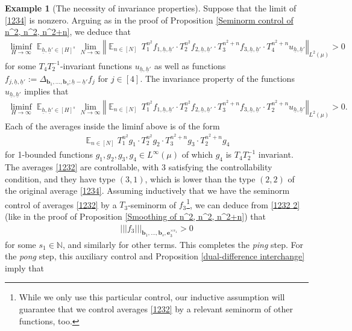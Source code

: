 \documentclass[11pt]{amsart}
\theoremstyle{definition}
\newtheorem{example}{Example}
\newcommand{\N}{{\mathbb N}}
\newcommand{\be}{{\mathbf{e}}}
\renewcommand{\b}{{\textbf{b}}}
\newcommand{\uh}{{\underline{h}}}
\newcommand{\norm}[1]{\left\Vert #1\right\Vert}
\newcommand{\nnorm}[1]{\lvert\!|\!| #1|\!|\!\rvert}
\newcommand{\inv}{^{-1}}
\DeclareMathOperator*{\E}{\mathbb{E}}
\begin{document}
\begin{example}[The necessity of invariance properties]
Suppose that the limit of \eqref{1234} is nonzero. Arguing as in the proof of Proposition \ref{Seminorm control of n^2, n^2, n^2+n}, we deduce  that
\begin{align*}
    \liminf_{H\to\infty}\E_{\uh,\uh'\in [H]^{s}}\lim_{N\to\infty}\norm{ \E_{n\in[N]} \, T_1^{n^2} f_{1, \uh, \uh'}\cdot T_2^{n^2} f_{2, \uh, \uh'}\cdot T_3^{n^2+n}f_{3, \uh, \uh'}\cdot T_4^{n^2+n}u_{\uh,\uh'}}_{L^2(\mu)}>0
\end{align*}
for some $T_4 T_2\inv$-invariant functions $u_{\uh, \uh'}$ as well as functions $f_{j, \uh,\uh'} := \Delta_{{\b_1}, \ldots, {\b_{s}}; \uh-\uh'} f_j$ for $j\in[4]$. The invariance property of the functions $u_{\uh, \uh'}$ implies that
\begin{align}\label{1232 2}
    \liminf_{H\to\infty}\E_{\uh,\uh'\in [H]^{s}}\lim_{N\to\infty}\norm{ \E_{n\in[N]} \, T_1^{n^2} f_{1, \uh, \uh'}\cdot T_2^{n^2} f_{2, \uh, \uh'}\cdot T_3^{n^2+n}f_{3, \uh, \uh'}\cdot T_2^{n^2+n}u_{\uh,\uh'}}_{L^2(\mu)}>0.
\end{align}
Each of the averages inside the liminf above is of the form
\begin{align}\label{1232}
     \E_{n\in[N]}T_1^{n^2} g_1\cdot T_2^{n^2} g_2\cdot T_3^{n^2+n}g_3\cdot T_2^{n^2+n}g_4
\end{align}
for 1-bounded functions $g_1, g_2, g_3, g_4\in L^\infty(\mu)$ of which $g_4$ is $T_4 T_2\inv$ invariant. The averages \eqref{1232} are controllable, with $3$ satisfying the controllability condition, and they have type $(3, 1)$, which is lower than the type $(2,2)$ of the original average \eqref{1234}. Assuming inductively that we have the seminorm control of averages \eqref{1232} by a $T_3$-seminorm of $f_3$\footnote{While we only use this particular control, our inductive assumption will guarantee that we control averages \eqref{1232} by a relevant seminorm of other functions, too.}, we can deduce from \eqref{1232 2} (like in the proof of Proposition \ref{Smoothing of n^2, n^2, n^2+n}) that
\begin{align*}%
    \nnorm{f_3}_{\b_1, \ldots, \b_s, \be_3^{\times s_1}}>0
\end{align*}
for some $s_1\in\N$, and similarly for other terms. This completes the \textit{ping} step. For the \textit{pong} step, this auxiliary control and Proposition \ref{dual-difference interchange} imply that

\end{example}
\end{document}
